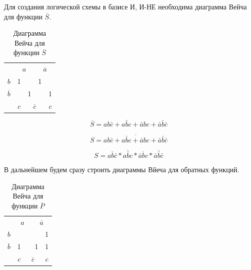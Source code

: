 \documentclass[a4paper,14pt]{article}
\begin{document}
Для создания логической схемы в базисе И, И-НЕ необходима диаграмма Вейча для функции $\overline{S}$.

\begin{table}[H]
	\begin{center}
		\caption{\label{tab:NSDvSum} Диаграмма Вейча для функции $\overline{S}$}
		\begin{tabular}{ccccc}
			& \multicolumn{2}{c}{$a$}                           & \multicolumn{2}{c}{$\overline{a}$}                          \\ \cline{2-5} 
			\multicolumn{1}{c|}{$b$}  & \multicolumn{1}{c|}{1}  & \multicolumn{1}{c|}{} & \multicolumn{1}{c|}{1}  & \multicolumn{1}{c|}{} \\ \cline{2-5} 
			\multicolumn{1}{c|}{$\overline{b}$} & \multicolumn{1}{c|}{} & \multicolumn{1}{c|}{1}  & \multicolumn{1}{c|}{} & \multicolumn{1}{c|}{1}  \\ \cline{2-5} 
			& $c$                     & \multicolumn{2}{c}{$\overline{c}$}                          & $c$                     
		\end{tabular}
	\end{center}
\end{table}

$$\overline{S} = ab\bar{c} + a\bar{b}c + \bar{a}bc + \bar{a}\bar{b}\bar{c}$$

$$S = \overline{ab\bar{c} + a\bar{b}c + \bar{a}bc + \bar{a}\bar{b}\bar{c}}$$

$$S = \overline{ab\bar{c}} * \overline{a\bar{b}c} * \overline{\bar{a}bc} * \overline{\bar{a}\bar{b}\bar{c}}$$

 В дальнейшем будем сразу строить диаграммы Вйеча для обратных функций.
 
 \begin{table}[H]
 	\begin{center}
 		\caption{\label{tab:NPDvSum} Диаграмма Вейча для функции $\overline{P}$}
 		\begin{tabular}{ccccc}
 			& \multicolumn{2}{c}{$a$}                           & \multicolumn{2}{c}{$\overline{a}$}                          \\ \cline{2-5} 
 			\multicolumn{1}{c|}{$b$}  & \multicolumn{1}{c|}{}  & \multicolumn{1}{c|}{} & \multicolumn{1}{c|}{}  & \multicolumn{1}{c|}{1} \\ \cline{2-5} 
 			\multicolumn{1}{c|}{$\overline{b}$} & \multicolumn{1}{c|}{1} & \multicolumn{1}{c|}{}  & \multicolumn{1}{c|}{1} & \multicolumn{1}{c|}{1}  \\ \cline{2-5} 
 			& $c$                     & \multicolumn{2}{c}{$\overline{c}$}                          & $c$                     
 		\end{tabular}
 	\end{center}
 \end{table}
\end{document}
